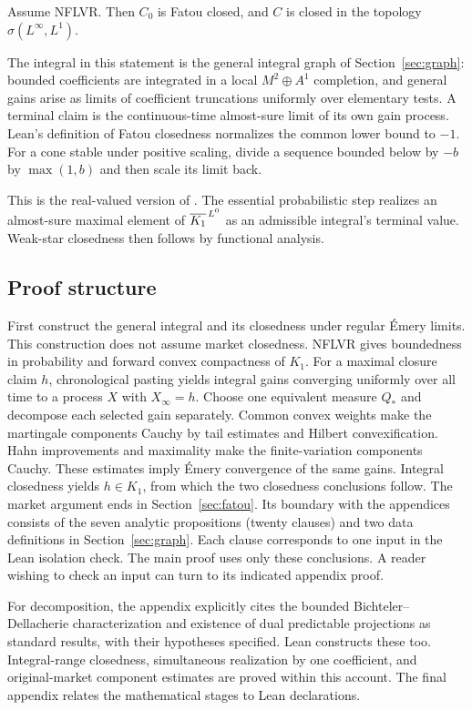 \begin{theorem}\label{thm:main}
Assume NFLVR. Then $C_0$ is Fatou closed, and $C$ is closed in the topology
$\sigma(L^\infty,L^1)$.
\end{theorem}
The integral in this statement is the general integral graph of
Section~\ref{sec:graph}: bounded coefficients are integrated in a local
$M^2\oplus A^1$ completion, and general gains arise as limits of coefficient
truncations uniformly over elementary tests. A terminal claim is the
continuous-time almost-sure limit of its own gain process.
Lean's definition of Fatou closedness normalizes the common lower bound to
$-1$. For a cone stable under positive scaling, divide a sequence bounded below
by $-b$ by $\max(1,b)$ and then scale its limit back.

This is the real-valued version of \cite[Theorem~4.2]{DS}.
The essential probabilistic step realizes an almost-sure maximal element of
$\overline{K_1}^{\,L^0}$ as an admissible integral's terminal value.
Weak-star closedness then follows by functional analysis.

\subsection{Proof structure}
First construct the general integral and its closedness under regular Émery
limits. This construction does not assume market closedness.
NFLVR gives boundedness in probability and forward convex compactness of $K_1$.
For a maximal closure claim $h$, chronological pasting yields integral gains
converging uniformly over all time to a process $X$ with $X_\infty=h$.
Choose one equivalent measure $Q_*$ and decompose each selected gain separately.
Common convex weights make the martingale components Cauchy by tail estimates
and Hilbert convexification. Hahn improvements and maximality make the
finite-variation components Cauchy. These estimates imply Émery convergence of
the same gains. Integral closedness yields $h\in K_1$, from which the two
closedness conclusions follow.
The market argument ends in Section~\ref{sec:fatou}.
Its boundary with the appendices consists of the seven analytic propositions (twenty clauses) and two data definitions in Section~\ref{sec:graph}.
Each clause corresponds to one input in the Lean isolation check. The main proof uses only these conclusions.
A reader wishing to check an input can turn to its indicated appendix proof.

For decomposition, the appendix explicitly cites the bounded
Bichteler--Dellacherie characterization and existence of dual predictable
projections as standard results, with their hypotheses specified.
Lean constructs these too. Integral-range closedness, simultaneous
realization by one coefficient, and original-market component estimates
are proved within this account. The final appendix relates the mathematical
stages to Lean declarations.

